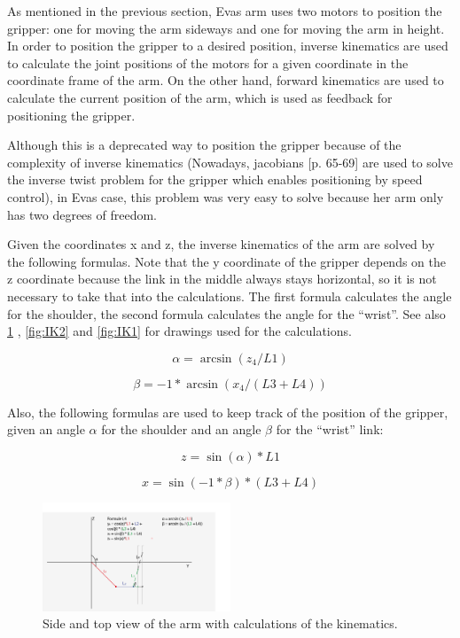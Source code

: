 \documentclass[project_eva.tex]{subfiles}
\begin{document}
As mentioned in the previous section, Eva\textquotesingle s arm uses two motors to position the gripper: one for moving 
the arm sideways and one for moving the arm in height. In order to position the gripper to a desired position, inverse 
kinematics are used to calculate the joint positions of the motors for a given coordinate in the coordinate frame of the 
arm. On the other hand, forward kinematics are used to calculate the current position of the arm, which is used as 
feedback for positioning the gripper. 

Although this is a deprecated way to position the gripper because of the complexity of inverse kinematics  (Nowadays, 
jacobians \cite{jacobian} [p. 65-69] are used to solve the inverse twist 
problem for the gripper which enables positioning by speed control), in Eva\textquotesingle s case, this problem was 
very easy to solve because her arm only has two degrees of freedom. 

Given the coordinates x and z, the inverse kinematics of the arm are solved by the following formulas. Note that the y 
coordinate of the gripper depends on the z coordinate because the link in the middle always stays horizontal, so it is 
not necessary to take that into the calculations. The first formula calculates the angle for the shoulder, the second 
formula calculates the angle for the ``wrist''. See also \ref{fig:IK0} , \ref{fig:IK2} and \ref{fig:IK1} for drawings 
used for the calculations.

\begin{equation*}
\alpha = \arcsin(z_4/L1)
\end{equation*}

\begin{equation*}
\beta = -1 * \arcsin(x_4/(L3 + L4))
\end{equation*}

Also, the following formulas are used to keep track of the position of the gripper, given an angle $\alpha$ for the 
shoulder and an angle $\beta$ for the ``wrist'' link:

\begin{equation*}
z = \sin(\alpha)*L1
\end{equation*}

\begin{equation*}
x = \sin(-1 * \beta)*(L3 + L4)
\end{equation*}

\begin{figure}[h]
	\centering
	\mbox{\includegraphics[width=0.5\textwidth]{Images/3d_zijenbovenaanzicht.png}}
	\caption{Side and top view of the arm with calculations of the kinematics.}
	\label{fig:IK0}
\end{figure}
\end{document}
